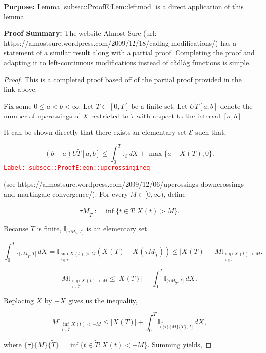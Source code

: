 \documentclass[12pt]{article}
\newcommand{\mb}{\mathbb}
\newcommand{\mc}{\mathcal}
\newcommand{\tr}{\textcolor{red}}
\newcommand{\labe}[1]{\tr{\texttt{Label: #1}}}
\newcommand{\purpose}{\textbf{Purpose: }}
\newcommand{\pfsum}{\textbf{Proof Summary: }}
\newcommand{\ind}{\hspace{24pt}}
\newcommand{\T}{T}								%
\renewcommand{\t}{t}							%
\newcommand{\X}{X}								%
\newcommand{\cind}[1]{_{#1}}					%
\newcommand{\tp}[1]{(#1)}						%
\newcommand{\tip}[1]{#1}						%
\newcommand{\alt}[1]{\widetilde{#1}}			%
\newcommand{\rt}{\tau}							%
\newcommand{\evnt}{\mc{E}}						%
\newcommand{\Tset}{\alt{T}}						%
\newcommand{\upcrs}{U}							%
\begin{document}
\purpose Lemma \ref{subsec::ProofE:Lem::leftmod} is a direct application of this lemma.

\pfsum The website Almost Sure (url: https://almostsure.wordpress.com/2009/12/18/cadlag-modifications/) has a statement of a similar result along with a partial proof. Completing the proof and adapting it to left-continuous modifications instead of c\`adl\`ag functions is simple.

\begin{proof}
This is a completed proof based off of the partial proof provided in the link above.

\ind Fix some \(0\leq a < b < \infty\). Let \(\Tset \subset [0,\T]\) be a finite set. Let \(\upcrs{\alt{\T}}[a,b]\) denote the number of upcrossings of \(\X\cind{}\tip{}\) restricted to \(\alt{\T}\) with respect to the interval \([a,b]\).

\ind It can be shown directly that there exists an elementary set \(\evnt{}\) such that,

\begin{equation}
(b-a)\upcrs{\Tset}[a,b] \leq \int_0^\T \mb{I}_{\evnt}\,d\X\cind{}\tip{} + \max\{a - \X\cind{}\tp{\T},0\}.
\label{subsec::ProofE:eqn::upcrossingineq}
\end{equation}
\labe{subsec::ProofE:eqn::upcrossingineq}

(see https://almostsure.wordpress.com/2009/12/06/upcrossings-downcrossings-and-martingale-convergence/). For every \(M \in [0,\infty)\), define

\[\rt{M}_{\Tset} := \inf\{\t\in \alt{\T}: \X\cind{}\tp{\t} > M\}.\]

Because \(\Tset\) is finite, \(\mb{I}_{(\rt{M}_{\Tset},\T]}\) is an elementary set.

\[\int_0^\T \mb{I}_{(\rt{M}_{\Tset},\T]}\,d\X\cind{}\tip{} = \mb{I}_{\sup_{\t\in \Tset} \X\cind{}\tp{\t} > M}(\X\cind{}\tp{\T} - \X\cind{}\tp{\rt{M}_{\Tset}}) \leq |\X\cind{}\tp{\T}| - M\mb{I}_{\sup_{\t \in \Tset} \X\cind{}\tp{\t} > M}.\]

\[M\mb{I}_{\sup_{\t\in\Tset} \X\cind{}\tp{\t} > M} \leq |\X\cind{}\tp{\T}| - \int_0^T \mb{I}_{(\rt{M}_{\Tset},\T]}\,d\X\cind{}\tip{}.\]


Replacing \(\X\cind{}\tip{}\) by \(-\X\cind{}\tip{}\) gives us the inequality,

\[M\mb{I}_{\inf_{\t\in\Tset} \X\cind{}\tp{\t} < -M} \leq |\X\cind{}\tp{\T}| + \int_0^T \mb{I}_{(\alt\{\rt\}\{M\}\{\Tset\},\T]}\,d\X\cind{}\tip{},\]

where \(\alt\{\rt\}\{M\}\{\Tset\} = \inf\{\t\in \Tset: \X\cind{}\tp{\t} < -M\}\). Summing yields,


\end{proof}
\end{document}
